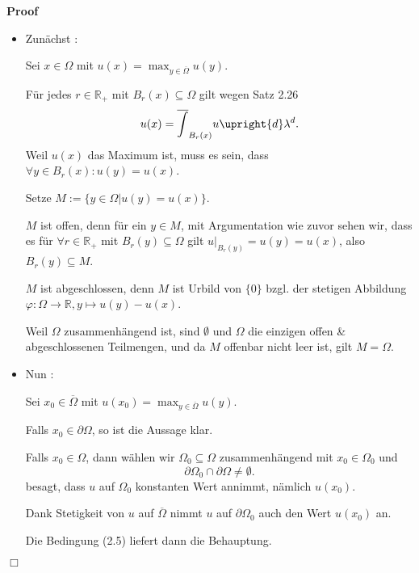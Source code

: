 \documentclass{book}
\newcommand{\assign}{:=}
\newcommand{\nobracket}{}
\newcommand{\tmtextit}[1]{\text{{\itshape{#1}}}}
\newenvironment{itemizedot}{\begin{itemize} \renewcommand{\labelitemi}{$\bullet$}\renewcommand{\labelitemii}{$\bullet$}\renewcommand{\labelitemiii}{$\bullet$}\renewcommand{\labelitemiv}{$\bullet$}}{\end{itemize}}
\newenvironment{proof}{\noindent\textbf{Proof\ }}{\hspace*{\fill}$\Box$\medskip}
\begin{document}
\begin{proof}
  
  \begin{itemizedot}
    \item Zun{\"a}chst \tmtextit{ii.}:
    
    Sei $x \in \Omega$ mit $u (x) = \max_{y \in \overline{\Omega}} u (y)$.
    
    F{\"u}r jedes $r \in \mathbb{R}_+$ mit $B_r (x) \subseteq \Omega$ gilt
    wegen Satz 2.26
    \begin{equation}
      u (x) = \overline{\int}_{B_r (x)} u \upright{d} \lambda^d .
    \end{equation}
    {\hspace{1.7em}}Weil $u (x)$ das Maximum ist, muss es sein, dass $\forall
    y \in B_r (x) : u (y) = u (x)$.
    
    Setze $M \assign \{ y \in \Omega | \nobracket u (y) = u (x) \}$.
    
    $M$ ist offen, denn f{\"u}r ein $y \in M$, mit Argumentation wie zuvor
    sehen wir, dass es f{\"u}r $\forall r \in \mathbb{R}_+$ mit $B_r (y)
    \subseteq \Omega$ gilt $u |_{B_r (y)} = \nobracket u (y) = u (x)$, also
    $B_r (y) \subseteq M$.
    
    $M$ ist abgeschlossen, denn $M$ ist Urbild von $\{ 0 \}$ bzgl. der
    stetigen Abbildung $\varphi : \Omega \rightarrow \mathbb{R}, y \mapsto u
    (y) - u (x)$.
    
    Weil $\Omega$ zusammenh{\"a}ngend ist, sind $\emptyset$ und $\Omega$ die
    einzigen offen \& abgeschlossenen Teilmengen, und da $M$ offenbar nicht
    leer ist, gilt $M = \Omega$.
    
    \item Nun \tmtextit{i.}:
    
    Sei $x_0 \in \overline{\Omega}$ mit $u (x_0) = \max_{y \in
    \overline{\Omega}} u (y)$.
    
    Falls $x_0 \in \partial \Omega$, so ist die Aussage klar.
    
    Falls $x_0 \in \Omega$, dann w{\"a}hlen wir $\Omega_0 \subseteq \Omega$
    zusammenh{\"a}ngend mit $x_0 \in \Omega_0$ und
    \begin{equation}
      \partial \Omega_0 \cap \partial \Omega \neq \emptyset .
    \end{equation}
    {\hspace{1.7em}}\tmtextit{ii.} besagt, dass $u$ auf $\Omega_0$ konstanten
    Wert annimmt, n{\"a}mlich $u (x_0)$.
    
    Dank Stetigkeit von $u$ auf $\overline{\Omega}$ nimmt $u$ auf $\partial
    \Omega_0$ auch den Wert $u (x_0)$ an.
    
    Die Bedingung (2.5) liefert dann die Behauptung. \ 
  \end{itemizedot}
\end{proof}
\end{document}
